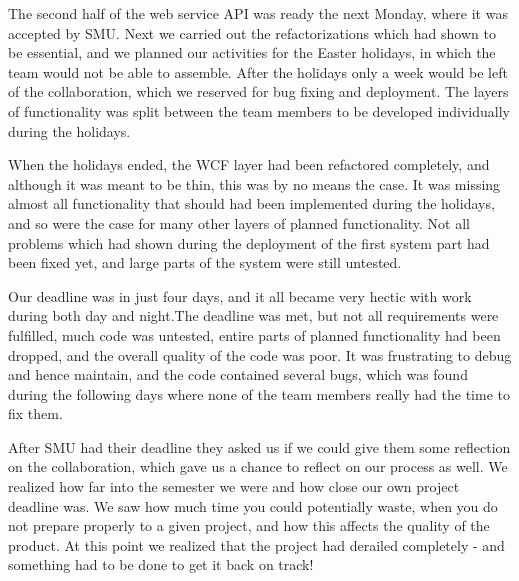 The second half of the web service API was ready the next Monday, where it was accepted by SMU. Next we carried out the refactorizations which had shown to be essential, and we planned our activities for the Easter holidays, in which the team would not be able to assemble. After the holidays only a week would be left of the collaboration, which we reserved for bug fixing and deployment. The layers of functionality was split between the team members to be developed individually during the holidays.

When the holidays ended, the WCF layer had been refactored completely, and although it was meant to be thin, this was by no means the case. It was missing almost all functionality that should had been implemented during the holidays, and so were the case for many other layers of planned functionality.
Not all problems which had shown during the deployment of the first system part had been fixed yet, and large parts of the system were still untested.

Our deadline was in just four days, and it all became very hectic with work during both day and night.The deadline was met, but not all requirements were fulfilled, much code was untested, entire parts of planned functionality had been dropped, and the overall quality of the code was poor. It was frustrating to debug and hence maintain, and the code contained several bugs, which was found during the following days where none of the team members really had the time to fix them.

After SMU had their deadline they asked us if we could give them some reflection on the collaboration, which gave us a chance to reflect on our process as well. We realized how far into the semester we were and how close our own project deadline was. We saw how much time you could potentially waste, when you do not prepare properly to a given project, and how this affects the quality of the product. At this point we realized that the project had derailed completely - and something had to be done to get it back on track!
\newpage